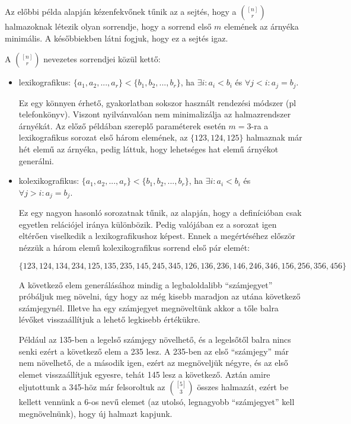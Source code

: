 \begin{obs}
  Az előbbi példa alapján kézenfekvőnek tűnik az a sejtés, hogy a $\binom{[n]}{r}$ halmazoknak létezik olyan sorrendje, hogy a sorrend első $m$ elemének az árnyéka minimális. A későbbiekben látni fogjuk, hogy ez a sejtés igaz.
\end{obs}


A $\binom{[n]}{r}$ nevezetes sorrendjei közül kettő:
\begin{itemize}
  \item lexikografikus:\hphantom{ko} $\{a_1, a_2, ..., a_r\} < \{b_1, b_2, ..., b_r\}$, ha $\exists i: a_i < b_i$ és $\forall j < i: a_j = b_j$.

  Ez egy könnyen érhető, gyakorlatban sokszor használt rendezési módszer (pl telefonkönyv). Viszont nyilvánvalóan nem minimalizálja az halmazrendszer árnyékát. Az előző példában szereplő paraméterek esetén $m=3$-ra a lexikografikus sorozat első három elemének, az $\{123, 124, 125\}$ halmaznak már hét elemű az árnyéka, pedig láttuk, hogy lehetséges hat elemű árnyékot generálni.
  \item kolexikografikus: $\{a_1, a_2, ..., a_r\} < \{b_1, b_2, ..., b_r\}$, ha $\exists i: a_i < b_i$ és $\forall j > i: a_j = b_j$.

  Ez egy nagyon hasonló sorozatnak tűnik, az alapján, hogy a definícióban csak egyetlen relációjel iránya különbözik. Pedig valójában ez a sorozat igen eltérően viselkedik a lexikografikushoz képest. Ennek a megértéséhez először nézzük a három elemű kolexikografikus sorrend első pár elemét:

  \[\{123, 124, 134, 234, 125, 135, 235, 145, 245, 345, 126, 136, 236, 146, 246, 346, 156, 256, 356, 456\}\]

 A következő elem generálásához mindig a legbaloldalibb ``számjegyet'' próbáljuk meg növelni, úgy hogy az még kisebb maradjon az utána következő számjegynél. Illetve ha egy számjegyet megnöveltünk akkor a tőle balra lévőket visszaállítjuk a lehető legkisebb értékükre.

 Például az 135-ben a legelső számjegy növelhető, és a legelsőtől balra nincs senki ezért a következő elem a 235 lesz. A 235-ben az első ``számjegy'' már nem növelhető, de a második igen, ezért az megnöveljük négyre, és az első elemet visszaállítjuk egyesre, tehát 145 lesz a következő. Aztán amire eljutottunk a 345-höz már felsoroltuk az $\binom{[5]}{3}$ összes halmazát, ezért be kellett vennünk a 6-os nevű elemet (az utolsó, legnagyobb ``számjegyet'' kell megnövelnünk), hogy új halmazt kapjunk.
\end{itemize}
